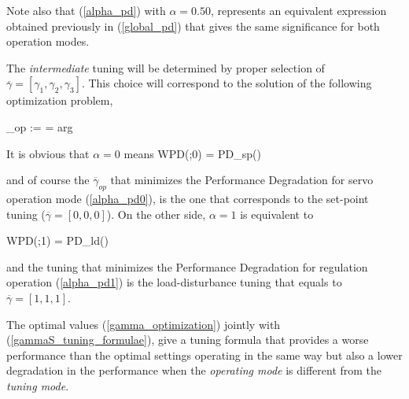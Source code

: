 Note also that (\ref{alpha_pd}) with $\alpha=0.50$, represents an
equivalent expression obtained previously in (\ref{global_pd})
that gives the same significance for both operation modes.

The \emph{intermediate} tuning will be determined by proper
selection of $\overline{\gamma} = \left [\gamma_1, \gamma_2,
\gamma_3 \right]$. This choice will correspond to the solution of
the following optimization problem,

\be \overline{\gamma}_{op} :=  = arg 
\label{gamma_optimization}\ee

It is obvious that $\alpha=0$ means
\be WPD(\overline{\gamma};0) =
PD_{sp}(\overline{\gamma}) \label{alpha_pd0} \ee

\noindent and of course the $\overline{\gamma}_{op}$ that
minimizes the Performance Degradation for servo operation mode
(\ref{alpha_pd0}), is the one that corresponds to the set-point
tuning ($\overline{\gamma}=[0,0,0]$). On the other side,
$\alpha=1$ is equivalent to

\be WPD(\overline{\gamma};1) = PD_{ld}(\overline{\gamma})
\label{alpha_pd1} \ee

\noindent and the tuning that minimizes the Performance
Degradation for regulation operation (\ref{alpha_pd1}) is the
load-disturbance tuning that equals to
$\overline{\gamma}=[1,1,1]$.

The optimal values (\ref{gamma_optimization}) jointly with
(\ref{gammaS_tuning_formulae}), give a tuning formula that
provides a worse performance than the optimal settings operating
in the same way but also a lower degradation in the performance
when the \emph{operating mode} is different from the \emph{tuning
mode}.
